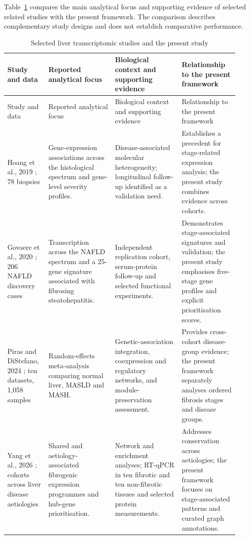 Table~\ref{tab:related} compares the main analytical focus and supporting evidence of selected related studies with the present framework. The comparison describes complementary study designs and does not establish comparative performance.

\begingroup
\small
\setlength{\tabcolsep}{4pt}
\renewcommand{\arraystretch}{1.15}
\begin{longtable}{@{}>{\raggedright\arraybackslash}p{0.16\linewidth}>{\raggedright\arraybackslash}p{0.27\linewidth}>{\raggedright\arraybackslash}p{0.27\linewidth}>{\raggedright\arraybackslash}p{0.23\linewidth}@{}}
\caption{Selected liver transcriptomic studies and the present study}\label{tab:related}\\
\toprule
Study and data & Reported analytical focus & Biological context and supporting evidence & Relationship to the present framework \\
\midrule
\endfirsthead
\toprule
Study and data & Reported analytical focus & Biological context and supporting evidence & Relationship to the present framework \\
\midrule
\endhead
\bottomrule
\endfoot
Hoang et al., 2019 \cite{ref4}; 78 biopsies & Gene-expression associations across the histological spectrum and gene-level severity profiles. & Disease-associated molecular heterogeneity; longitudinal follow-up identified as a validation need. & Establishes a precedent for stage-related expression analysis; the present study combines evidence across cohorts. \\
\addlinespace
Govaere et al., 2020 \cite{govaere2020}; 206 NAFLD discovery cases & Transcription across the NAFLD spectrum and a 25-gene signature associated with fibrosing steatohepatitis. & Independent replication cohort, serum-protein follow-up and selected functional experiments. & Demonstrates stage-associated signatures and validation; the present study emphasises five-stage gene profiles and explicit prioritisation scores. \\
\addlinespace
Piras and DiStefano, 2024 \cite{piras2024}; ten datasets, 1,058 samples & Random-effects meta-analysis comparing normal liver, MASLD and MASH. & Genetic-association integration, coexpression and regulatory networks, and module-preservation assessment. & Provides cross-cohort disease-group evidence; the present framework separately analyses ordered fibrosis stages and disease groups. \\
\addlinespace
Yang et al., 2026 \cite{yang2026}; cohorts across liver disease aetiologies & Shared and aetiology-associated fibrogenic expression programmes and hub-gene prioritisation. & Network and enrichment analyses; RT-qPCR in ten fibrotic and ten non-fibrotic tissues and selected protein measurements. & Addresses conservation across aetiologies; the present framework focuses on stage-associated patterns and curated graph annotations. \\

\end{longtable}
